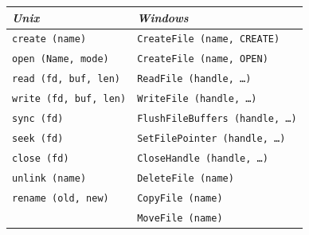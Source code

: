 \documentclass[11pt,a4paper]{article}
\begin{document}
\begin{tabular}{l l}
    \toprule
    \emph{Unix}                    & \emph{Windows} \\
    \midrule
    \texttt{create\,(name)}        & \texttt{CreateFile\,(name, CREATE)} \\
    \texttt{open\,(Name, mode)}    & \texttt{CreateFile\,(name, OPEN)} \\
    \texttt{read\,(fd, buf, len)}  & \texttt{ReadFile\,(handle, \dots)} \\
    \texttt{write\,(fd, buf, len)} & \texttt{WriteFile\,(handle, \dots)} \\
    \texttt{sync\,(fd)}            & \texttt{FlushFileBuffers\,(handle, \dots)} \\
    \texttt{seek\,(fd)}            & \texttt{SetFilePointer\,(handle, \dots)} \\
    \texttt{close\,(fd)}           & \texttt{CloseHandle\,(handle, \dots)} \\
    \texttt{unlink\,(name)}        & \texttt{DeleteFile\,(name)} \\
    \texttt{rename\,(old, new)}    & \texttt{CopyFile\,(name)} \\
                                   & \texttt{MoveFile\,(name)} \\
                                   \bottomrule
\end{tabular}
\end{document}
